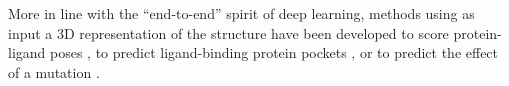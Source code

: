 More in line with the ``end-to-end'' spirit of deep learning, methods
using as input a 3D representation of the structure have been
developed to score protein-ligand
poses \cite{ragoza2017ligandscoring}, to predict ligand-binding
protein pockets \cite{jimenez2017deepsite}, or to predict the effect
of a mutation \cite{torng2017}.
